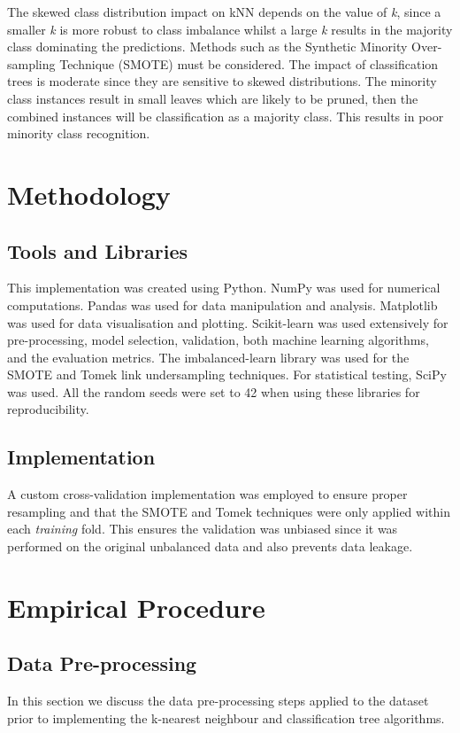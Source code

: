 \documentclass[10pt, conference]{IEEEtran}
\begin{document}
The skewed class distribution impact on kNN depends on the value of \textit{k}, since a smaller \textit{k} is more robust to class imbalance whilst a large \textit{k} results in the majority class dominating the predictions. Methods such as the Synthetic Minority Over-sampling Technique (SMOTE) must be considered. The impact of classification trees is moderate since they are sensitive to skewed distributions. The minority class instances result in small leaves which are likely to be pruned, then the combined instances will be classification as a majority class. This results in poor minority class recognition.

\section{Methodology}
\subsection{Tools and Libraries}
This implementation was created using Python. NumPy\cite{harris2020array} was used for numerical computations. Pandas\cite{reback2020pandas} was used for data manipulation and analysis. Matplotlib\cite{Hunter:2007} was used for data visualisation and plotting. Scikit-learn\cite{scikit-learn} was used extensively for pre-processing, model selection, validation, both machine learning algorithms, and the evaluation metrics. The imbalanced-learn library\cite{JMLR:v18:16-365} was used for the SMOTE and Tomek link undersampling techniques. For statistical testing, SciPy\cite{2020SciPy-NMeth} was used. All the random seeds were set to 42 when using these libraries for reproducibility.

\subsection{Implementation}
A custom cross-validation implementation was employed to ensure proper resampling and that the SMOTE and Tomek techniques were only applied within each \textit{training} fold. This ensures the validation was unbiased since it was performed on the original unbalanced data and also prevents data leakage.

\section{Empirical Procedure}

\subsection{Data Pre-processing}
In this section we discuss the data pre-processing steps applied to the dataset prior to implementing the k-nearest neighbour and classification tree algorithms.
\end{document}
